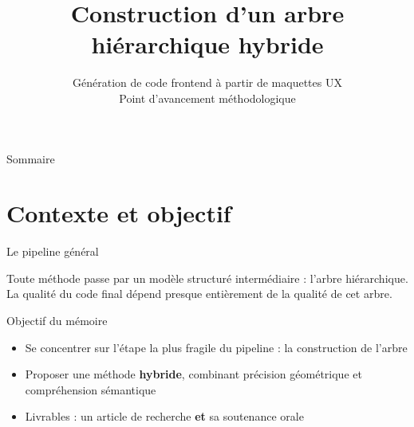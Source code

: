 \documentclass[11pt,aspectratio=169]{beamer}
\title{Construction d'un arbre hiérarchique hybride}
\subtitle{Génération de code frontend à partir de maquettes UX \\ \small Point d'avancement méthodologique}
\author{}
\date{}
\begin{document}
\maketitle

\begin{frame}{Sommaire}
  \tableofcontents
\end{frame}

\section{Contexte et objectif}

\begin{frame}{Le pipeline général}
  \begin{center}
  \end{center}
  \vspace{6mm}
  \begin{center}
  \begin{minipage}{0.85\textwidth}
  \centering
  Toute méthode passe par un modèle structuré intermédiaire : \alert{l'arbre hiérarchique}. \\[4pt]
  \small La qualité du code final dépend presque entièrement de la qualité de cet arbre.
  \end{minipage}
  \end{center}
\end{frame}

\begin{frame}{Objectif du mémoire}
  \begin{itemize}
    \item Se concentrer sur l'étape la plus fragile du pipeline : \alert{la construction de l'arbre}
    \item Proposer une méthode \textbf{hybride}, combinant précision géométrique et compréhension sémantique
    \item Livrables : un article de recherche \textbf{et} sa soutenance orale
  \end{itemize}
\end{frame}
\end{document}

